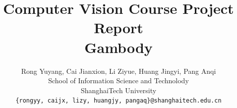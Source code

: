 \documentclass[11pt,twocolumn,letterpaper]{article}
\begin{document}
\title{
Computer Vision Course Project Report\\
Gambody
}

\author{Rong Yuyang, Cai Jianxion, Li Ziyue, Huang Jingyi, Pang Anqi\\
School of Information Science and Technolody\\
ShanghaiTech University\\
{\tt\small \{rongyy, caijx, lizy, huangjy, pangaq\}@shanghaitech.edu.cn}
}

\maketitle

\begin{abstract}

\end{abstract}
\end{document}
